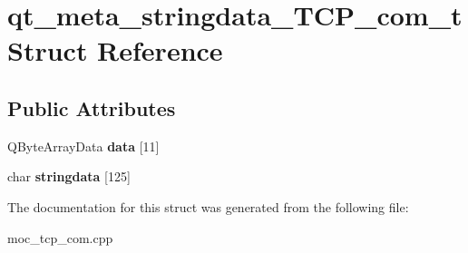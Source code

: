 \section{qt\-\_\-meta\-\_\-stringdata\-\_\-\-T\-C\-P\-\_\-com\-\_\-t Struct Reference}
\label{structqt__meta__stringdata___t_c_p__com__t}
\subsection*{Public Attributes}
\begin{DoxyCompactItemize}
\item 
Q\-Byte\-Array\-Data {\bfseries data} [11]\label{structqt__meta__stringdata___t_c_p__com__t_a7936d3e222d40a3f2cbdc7f70bfe3492}

\item 
char {\bfseries stringdata} [125]\label{structqt__meta__stringdata___t_c_p__com__t_af357223b35d9926d0c10a4f56e285f68}

\end{DoxyCompactItemize}


The documentation for this struct was generated from the following file\-:\begin{DoxyCompactItemize}
\item 
moc\-\_\-tcp\-\_\-com.\-cpp\end{DoxyCompactItemize}
